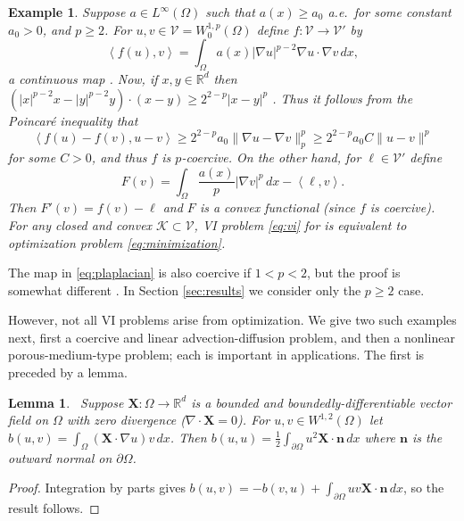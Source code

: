 \documentclass[letterpaper,final,12pt,reqno]{amsart}
\theoremstyle{cstyle}
\newtheorem{lemma}[theorem]{Lemma}
\theoremstyle{cstyle*}
\theoremstyle{dstyle}
\newtheorem{example}[theorem]{Example}
\numberwithin{equation}{section}
\numberwithin{figure}{section}
\numberwithin{table}{section}
\numberwithin{theorem}{section}
\newcommand{\RR}{\mathbb{R}}
\newcommand{\grad}{\nabla}
\newcommand{\Div}{\nabla\cdot}
\newcommand{\bn}{\mathbf{n}}
\newcommand{\bX}{\mathbf{X}}
\newcommand{\cK}{\mathcal{K}}
\newcommand{\cV}{\mathcal{V}}
\newcommand{\ip}[2]{\left<#1,#2\right>}
\begin{document}
\begin{example}  \label{ex:plaplacian}  Suppose $a\in L^\infty(\Omega)$ such that $a(x)\ge a_0$ a.e.~for some constant $a_0>0$, and $p\ge 2$.  For $u,v \in \cV = W^{1,p}_0(\Omega)$ define $f:\cV \to \cV'$ by
\begin{equation}
\ip{f(u)}{v} = \int_\Omega a(x) |\grad u|^{p-2} \grad u \cdot \grad v\,dx, \label{eq:plaplacian}
\end{equation}
a continuous map \cite[Theorem A.0.6]{Peral1997}.  Now, if $x,y\in\RR^d$ then $(|x|^{p-2} x - |y|^{p-2} y)\cdot (x-y) \ge 2^{2-p} |x-y|^p$ \cite[see Appendix A and references therein]{Bueler2021conservation}.  Thus it follows from the Poincar\'e inequality that
    $$\ip{f(u) - f(v)}{u-v} \ge 2^{2-p} a_0 \|\grad u - \grad v\|_p^p \ge 2^{2-p} a_0 C \|u-v\|^p$$
for some $C>0$, and thus $f$ is $p$-coercive.  On the other hand, for $\ell\in\cV'$ define
    $$F(v) = \int_\Omega \frac{a(x)}{p} |\grad v|^p\,dx - \ip{\ell}{v}.$$
Then $F'(v) = f(v) - \ell$ and $F$ is a convex functional (since $f$ is coercive).  For any closed and convex $\cK\subset \cV$, VI problem \eqref{eq:vi} for is equivalent to optimization problem \eqref{eq:minimization}.\end{example}

The map in \eqref{eq:plaplacian} is also coercive if $1<p<2$, but the proof is somewhat different \cite[Theorem 4.4]{Bueler2021conservation}.  In Section \ref{sec:results} we consider only the $p\ge 2$ case.

However, not all VI problems arise from optimization.  We give two such examples next, first a coercive and linear advection-diffusion problem, and then a nonlinear porous-medium-type problem; each is important in applications.  The first is preceded by a lemma.

\begin{lemma}  \label{lem:advectionskew}  \cite{Elmanetal2014}\,  Suppose $\bX :\Omega \to \RR^d$ is a bounded and boundedly-differentiable vector field on $\Omega$ with zero divergence ($\Div \bX=0$).  For $u,v \in W^{1,2}(\Omega)$ let $b(u,v) = \int_\Omega (\bX \cdot \grad u) v\,dx$.  Then $b(u,u) = \frac{1}{2} \int_{\partial \Omega} u^2 \bX\cdot \bn\,dx$ where $\bn$ is the outward normal on $\partial \Omega$.
\end{lemma}

\begin{proof}
Integration by parts gives $b(u,v) = - b(v,u) + \int_{\partial \Omega} uv \bX\cdot \bn\,dx$, so the result follows.
\end{proof}
\end{document}

